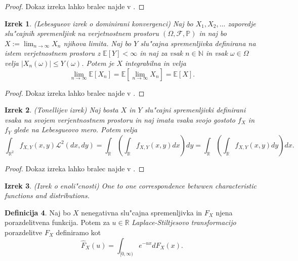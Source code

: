 \documentclass[12pt, a4paper, reqno]{amsart}
\theoremstyle{definition}
\newtheorem{definicija}{Definicija}[section]
\theoremstyle{plain}
\newtheorem{izrek}[definicija]{Izrek}
\newcommand{\R}{\mathbb{R}}
\newcommand{\N}{\mathbb{N}}
\newcommand{\E}{\mathbb{E}}
\newcommand{\Prob}{\mathbb{P}}
\newcommand{\1}{\mathds{1}}
\begin{document}
    \begin{proof}
        Dokaz izreka lahko bralec najde v \cite{7}.
    \end{proof}  

    \begin{izrek}(Lebesgueov izrek o dominirani konvergenci)
        Naj bo $X_1, X_2, \dots $ zaporedje slu"cajnih spremenljivk na verjetnostnem prostoru
        $(\Omega, \mathcal{F}, \Prob)$ in naj bo $X:= \lim_{n\to\infty}X_n$ njihova limita.
        Naj bo $Y$ slu"cajna spremenljivka definirana na istem verjetnostnem prostoru z $\E\left[Y\right]<\infty$ in
        naj za vsak $n\in\N$ in vsak $\omega\in\Omega$ velja $|X_n(\omega)| \leq Y(\omega)$. Potem je $X$ integrabilna
        in velja 
        \begin{equation*}
            \lim_{n\to\infty}\E\left[X_n\right] = \E\left[\lim_{n\to\infty}X_n\right] = \E\left[X\right].
        \end{equation*}
        \label{izr:dominiranaKonvergenca}
    \end{izrek}

    \begin{proof}
        Dokaz izreka lahko bralec najde v \cite{7}.
    \end{proof}

    \begin{izrek}(Tonellijev izrek)
        Naj bosta $X$ in $Y$ slu"cajni spremenljivki definirani vsaka na svojem verjentnostnem prostoru
        in naj imata vsaka svojo gostoto $f_X$ in $f_Y$ glede na Lebesgueovo mero.
        Potem velja
        \begin{equation*}
            \int_{\R^2}f_{X, Y}(x, y)\mathcal{L}^2(dx, dy) 
            = \int_{\R}\left(\int_{\R}f_{X, Y}(x, y)dx\right)dy = \int_{\R}\left(\int_{\R}f_{X, Y}(x, y)dy\right)dx.
        \end{equation*}
        \label{izr:TonellijevIzrek}
    \end{izrek}

    \begin{proof}
        Dokaz izreka lahko bralec najde v \cite{7}.
    \end{proof} 

    \begin{izrek}(Izrek o enoli"cnosti)
        One to one correspondence betwwen characteristic functions and distributions.
    \end{izrek}

    \begin{definicija}
        Naj bo $X$ nenegativna slu"cajna spremenljivka in $F_X$ njena porazdelitvena funkcija. 
        Potem za $u\in\R$ \textit{Laplace-Stiltjesovo transformacijo} porazdelitve $F_X$ definiramo kot
        \begin{equation*}
            \hat{F}_X(u) = \int_{[0, \infty)}e^{-ux}dF_X(x).
        \end{equation*}
        \label{def:LaplaceStiltjesovaTransformacija}
    \end{definicija}
\end{document}

